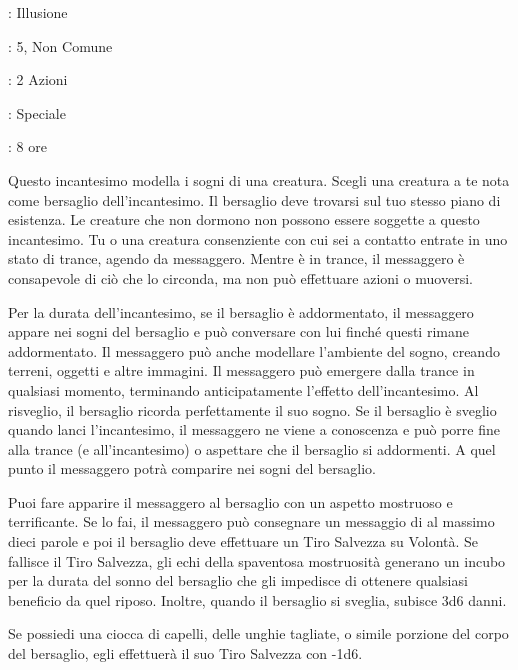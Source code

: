 \begin{multicols}{2}
\noindent\colorbox{OBSSgold!10}{
\begin{minipage}{0.95\linewidth}
\begin{description}[noitemsep, topsep=0pt, parsep=0pt, partopsep=0pt, leftmargin=0cm, labelwidth=1.3cm]
	\item[\textbf{Lista}]: Illusione
	\item[\textbf{Livello}]: 5, Non Comune
	\item[\textbf{Lancio}]: 2 Azioni
	\item[\textbf{Gittata}]: Speciale
	\item[\textbf{Durata}]: 8 ore
\end{description}
\end{minipage}}\smallskip

Questo incantesimo modella i sogni di una creatura. Scegli una creatura a te nota come bersaglio dell'incantesimo. Il bersaglio deve trovarsi sul tuo stesso piano di esistenza. Le creature che non dormono non possono essere soggette a questo incantesimo. Tu o una creatura consenziente con cui sei a contatto entrate in uno stato di trance, agendo da messaggero. Mentre è in trance, il messaggero è consapevole di ciò che lo circonda, ma non può effettuare azioni o muoversi.

Per la durata dell'incantesimo, se il bersaglio è addormentato, il messaggero appare nei sogni del bersaglio e può conversare con lui finché questi rimane addormentato. Il messaggero può anche modellare l'ambiente del sogno, creando terreni, oggetti e altre immagini. Il messaggero può emergere dalla trance in qualsiasi momento, terminando anticipatamente l'effetto dell'incantesimo. Al risveglio, il bersaglio ricorda perfettamente il suo sogno. Se il bersaglio è sveglio quando lanci l'incantesimo, il messaggero ne viene a conoscenza e può porre fine alla trance (e all'incantesimo) o aspettare che il bersaglio si addormenti. A quel punto il messaggero potrà comparire nei sogni del bersaglio.

Puoi fare apparire il messaggero al bersaglio con un aspetto mostruoso e terrificante. Se lo fai, il messaggero può consegnare un messaggio di al massimo dieci parole e poi il bersaglio deve effettuare un Tiro Salvezza su Volontà. Se fallisce il Tiro Salvezza, gli echi della spaventosa mostruosità generano un incubo per la durata del sonno del bersaglio che gli impedisce di ottenere qualsiasi beneficio da quel riposo. Inoltre, quando il bersaglio si sveglia, subisce 3d6 danni.

Se possiedi una ciocca di capelli, delle unghie tagliate, o simile porzione del corpo del bersaglio, egli effettuerà il suo Tiro Salvezza con -1d6.


\end{multicols}
